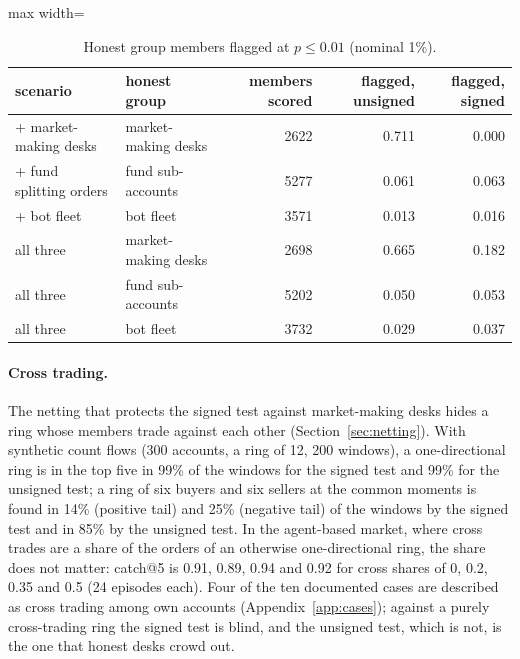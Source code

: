 \begin{table}[t]
\centering\footnotesize
{}
\caption{catch@5 in a clean market and with honest groups acting in step (95\% bootstrap intervals).}\label{tab:robust}
\end{table}

\begin{table}[t]
\centering\footnotesize
\begin{adjustbox}{max width=\linewidth}
\begin{tabular}{llrrr}
\toprule
scenario & honest group & members scored & flagged, unsigned & flagged, signed\\
\midrule
+ market-making desks & market-making desks & 2622 & 0.711 & 0.000\\
+ fund splitting orders & fund sub-accounts & 5277 & 0.061 & 0.063\\
+ bot fleet & bot fleet & 3571 & 0.013 & 0.016\\
all three & market-making desks & 2698 & 0.665 & 0.182\\
all three & fund sub-accounts & 5202 & 0.050 & 0.053\\
all three & bot fleet & 3732 & 0.029 & 0.037\\
\bottomrule
\end{tabular}
\end{adjustbox}
\caption{Honest group members flagged at $p\le 0.01$ (nominal 1\%).}\label{tab:groups}
\end{table}

\paragraph{Cross trading.} The netting that protects the signed test against market-making desks hides a ring whose members trade against each other (Section~\ref{sec:netting}). With synthetic count flows (300 accounts, a ring of 12, 200 windows), a one-directional ring is in the top five in 99\% of the windows for the signed test and 99\% for the unsigned test; a ring of six buyers and six sellers at the common moments is found in 14\% (positive tail) and 25\% (negative tail) of the windows by the signed test and in 85\% by the unsigned test. In the agent-based market, where cross trades are a share of the orders of an otherwise one-directional ring, the share does not matter: catch@5 is 0.91, 0.89, 0.94 and 0.92 for cross shares of 0, 0.2, 0.35 and 0.5 (24 episodes each). Four of the ten documented cases are described as cross trading among own accounts (Appendix~\ref{app:cases}); against a purely cross-trading ring the signed test is blind, and the unsigned test, which is not, is the one that honest desks crowd out.

